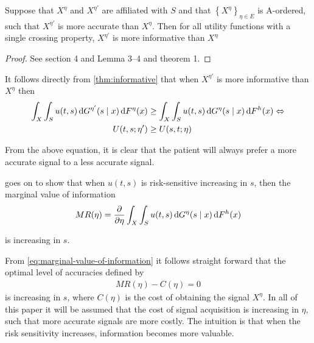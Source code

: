 \begin{theorem}\label{thm:informative}
\parencite{Persico2000}
Suppose that \(X^{\eta}\) and \(X^{\eta'}\) are affiliated with \(S\) and that \(\left \{X^{\eta}\right \} _{\eta\in E}\) is A-ordered, such that \(X^{\eta'}\) is more accurate than \(X^{\eta}\). Then for all utility functions with a single crossing property, \(X^{\eta'}\) is more informative than \(X^{\eta}\)
\end{theorem}
\begin{proof}
See \citet{Lehmann1988} section 4 and \citet{Karlin1956} Lemma 3--4 and theorem 1.
\end{proof}

It follows directly from \cref{thm:informative} that when \(X^{\eta'}\) is more informative than \(X^{\eta}\)  then
\begin{align}
	\label{eq:utility-increasing-information}
	\begin{split}
	\int_{X}\int_{S}u(t,s)\dif G^{\eta'}(s\mid x)\dif F^\eta(x)&\geq \int_{X}\int_{S}u(t,s)\dif G^{\eta}(s\mid x)\dif F^h(x) \Leftrightarrow \\
	U(t,s;\eta')&\geq U(s,t;\eta)
\end{split}
\end{align}

From the above equation, it is clear that the patient will always prefer a more accurate signal to a less accurate signal.

\textcite{Persico2000} goes on to show that when \(u(t,s)\) is risk-sensitive increasing in \(s\), then the marginal value of information
\begin{align}
		MR(\eta)=\frac{\partial}{\partial \eta} \int_{X}\int_{S}u(t,s)\dif G^{\eta}(s\mid x)\dif F^h(x) \label{eq:marginal-value-of-information}
\end{align}


is increasing in \(s\).

From \cref{eq:marginal-value-of-information} it follows straight forward that the optimal level of accuracies defined by
\begin{align}
	MR(\eta)-C(\eta)=0
\end{align}
 is increasing in \(s\), where \(C(\eta)\) is the cost of obtaining the signal \(X^\eta\). In all of this paper it will be assumed that the cost of signal acquisition is increasing in \(\eta\), such that more accurate signals are more costly. The intuition is that when the risk sensitivity increases, information becomes more valuable.

